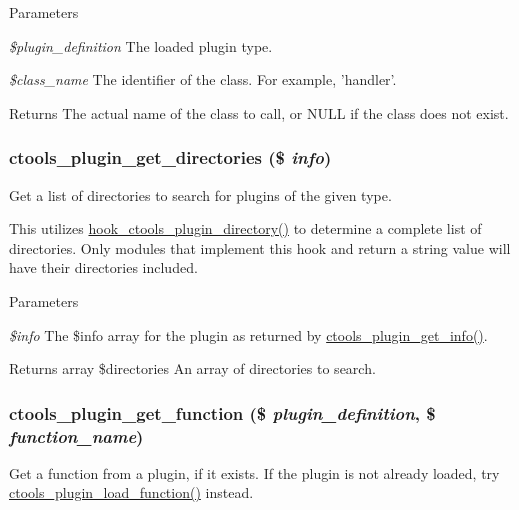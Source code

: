 \begin{DoxyParams}{Parameters}
\item[{\em \$plugin\_\-definition}]The loaded plugin type. \item[{\em \$class\_\-name}]The identifier of the class. For example, 'handler'.\end{DoxyParams}
\begin{DoxyReturn}{Returns}
The actual name of the class to call, or NULL if the class does not exist. 
\end{DoxyReturn}
\hypertarget{ctools_2includes_2plugins_8inc_a6f8865ad642e7d820c82c7862f733157}{
\subsubsection[{ctools\_\-plugin\_\-get\_\-directories}]{\setlength{\rightskip}{0pt plus 5cm}ctools\_\-plugin\_\-get\_\-directories (\$ {\em info})}}
\label{ctools_2includes_2plugins_8inc_a6f8865ad642e7d820c82c7862f733157}
Get a list of directories to search for plugins of the given type.

This utilizes \hyperlink{group__hooks_gaf17a0de7a7ca6e6c30c766ea1e44715e}{hook\_\-ctools\_\-plugin\_\-directory()} to determine a complete list of directories. Only modules that implement this hook and return a string value will have their directories included.


\begin{DoxyParams}{Parameters}
\item[{\em \$info}]The \$info array for the plugin as returned by \hyperlink{ctools_2includes_2plugins_8inc_addf3f6a3107a10cf5fb701420a9f8dcb}{ctools\_\-plugin\_\-get\_\-info()}.\end{DoxyParams}
\begin{DoxyReturn}{Returns}
array \$directories An array of directories to search. 
\end{DoxyReturn}
\hypertarget{ctools_2includes_2plugins_8inc_a5d95e845938d9bd5f3868de95799c0b0}{
\subsubsection[{ctools\_\-plugin\_\-get\_\-function}]{\setlength{\rightskip}{0pt plus 5cm}ctools\_\-plugin\_\-get\_\-function (\$ {\em plugin\_\-definition}, \/  \$ {\em function\_\-name})}}
\label{ctools_2includes_2plugins_8inc_a5d95e845938d9bd5f3868de95799c0b0}
Get a function from a plugin, if it exists. If the plugin is not already loaded, try \hyperlink{ctools_2includes_2plugins_8inc_aebe9811456caa97876b9b7bc12910fef}{ctools\_\-plugin\_\-load\_\-function()} instead.


